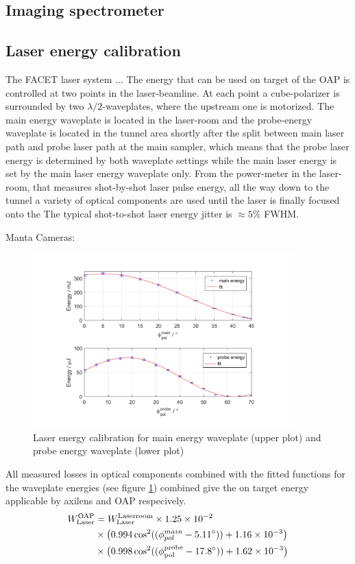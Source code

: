 \subsection{Imaging spectrometer}

\subsection{Laser energy calibration}
The FACET laser system ...
The energy that can be used on target of the OAP is controlled at two points in the laser-beamline.
At each point a cube-polarizer is surrounded by two  $\lambda/2$-waveplates, where the upstream one is motorized.
The main energy waveplate is located in the laser-room and the probe-energy waveplate is located in the tunnel area shortly after the split between main laser path and probe laser path at the main sampler, which means that the probe laser energy is determined by both waveplate settings while the main laser energy is set by the main laser energy waveplate only. From the power-meter in the laser-room, that measures shot-by-shot laser pulse energy, all the way down to the tunnel a variety of optical components are used until the laser is finally focused onto the 
The typical shot-to-shot laser energy jitter  is $\approx 5 \%$ FWHM.

Manta Cameras: \cite{GigE125_datasheet}

\begin{figure}[htbp]
\includegraphics[width=0.9\textwidth]{experiment/images/edited/waveplate_calibration.pdf}
\caption{Laser energy calibration for main energy waveplate (upper plot) and probe energy waveplate (lower plot)}
\label{img:LaserEnergyCalib}
\end{figure}

All measured losses in optical components combined with the fitted functions for the waveplate energies (see figure \ref{img:LaserEnergyCalib}) combined give the on target energy applicable by axilens and OAP respecively.
\begin{align*}
 W_\mathrm{Laser}^\mathrm{OAP} &= W_\mathrm{Laser}^\mathrm{Laserroom}\times 1.25\times10^{-2}\\ 
 &\times\big( 0.994 \cos^2((\phi_{pol}^{main}-5.11\degree)) +1.16\times 10^{-3}\big)\\
  &\times \big(0.998 \cos^2((\phi_\mathrm{pol}^\mathrm{probe}-17.8\degree )) +1.62\times 10^{-3}\big)
\end{align*}

